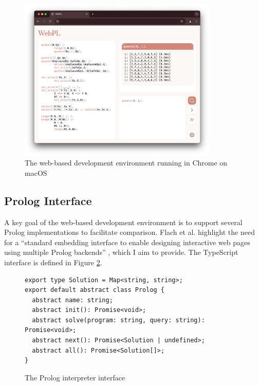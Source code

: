 \begin{figure}[H]
\centering
\includegraphics[width=0.85\textwidth]{07implementation_browser.png}
\caption{The web-based development environment running in Chrome on macOS}
\label{fig:webpl}
\end{figure}

\subsection{Prolog Interface}

\label{sec:prolog-interface}

A key goal of the web-based development environment is to support several Prolog implementations to facilitate comparison. Flach et al. highlight the need for a ``standard embedding interface to enable designing interactive web pages using multiple Prolog backends'' \cite{flachSimplyLogicalFirst2023}, which I aim to provide. The TypeScript interface is defined in Figure \ref{fig:prolog-interface}.

\begin{figure}[H]
\centering
\begin{verbatim}
export type Solution = Map<string, string>;
export default abstract class Prolog {
  abstract name: string;
  abstract init(): Promise<void>;
  abstract solve(program: string, query: string): Promise<void>;
  abstract next(): Promise<Solution | undefined>;
  abstract all(): Promise<Solution[]>;
}
\end{verbatim}
\caption{The Prolog interpreter interface}
\label{fig:prolog-interface}
\end{figure}

\vspace*{-1.5em}

